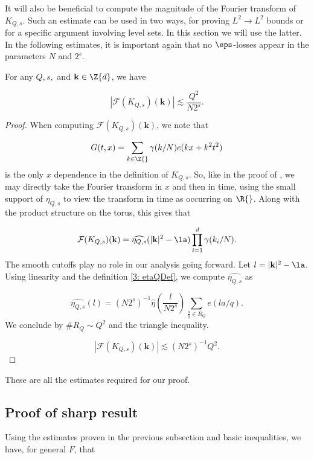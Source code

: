 \documentclass[11pt]{amsart}
\begin{document}
It will also be beneficial to compute the magnitude of the Fourier transform of $K_{Q,s}$. Such an estimate can be used in two ways, for proving $L^2\rightarrow L^2$ bounds or for a specific argument involving level sets. In this section we will use the latter. In the following estimates, it is important again that no $\eps$-losses appear in the parameters $N$ and $2^s$.

\begin{proposition}\label{3: KQsFourierCoeffBoundProp}
    For any $Q,s,$ and $\mathbf{k}\in\Z{d}$, we have

    \begin{equation}\label{3: smallQKQsFourierCoeffBoundEqn}
        |\mathcal{F}(K_{Q,s})(\mathbf{k})| \lesssim \frac{Q^2}{N2^s}.
    \end{equation}
\end{proposition}

\begin{proof}
    When computing $\mathcal{F}(K_{Q,s})(\mathbf{k})$, we note that 

    $$G(t,x) = \sum_{k\in \Z{}}\gamma(k/N)e(kx+k^2t^2)$$
    is the only $x$ dependence in the definition of $K_{Q,s}$. So, like in the proof of , we may directly take the Fourier transform in $x$ and then in time, using the small support of $\eta_{Q,s}$ to view the transform in time as occurring on $\R{}$. Along with the product structure on the torus, this gives that

    \begin{equation*}
        \mathcal{F}(K_{Q,s})(\mathbf{k}) = \widehat{\eta_{Q,s}}(|\mathbf{k}|^2-\la)\prod_{i=1}^d\gamma(k_i/N).
    \end{equation*}
    The smooth cutoffs play no role in our analysis going forward. Let $l= |\mathbf{k}|^2-\la$. Using linearity and the definition \eqref{3: etaQDef}, we compute $\widehat{\eta_{Q,s}}$ as

    \begin{equation*}
        \widehat{\eta_{Q,s}}(l) = (N2^s)^{-1}\hat{\eta}(\frac{l}{N2^s})\sum_{\frac{a}{q}\in R_Q}e(la/q).
    \end{equation*}
    We conclude by $\#R_Q\sim Q^2$ and the triangle inequality. 

    $$|\mathcal{F}(K_{Q,s})(\mathbf{k})|\lesssim (N2^s)^{-1}Q^2.$$
\end{proof}
\noindent
These are all the estimates required for our proof.
\subsection{Proof of sharp result}
Using the estimates proven in the previous subsection and basic inequalities, we have, for general $F$, that
\end{document}
